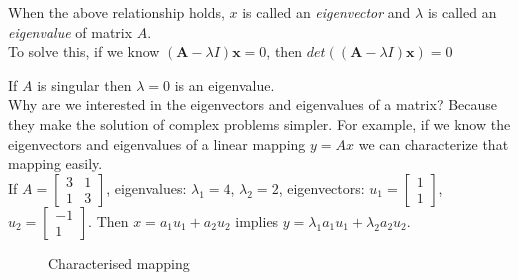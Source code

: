  When the above relationship holds, \( x \) is called an \textit{eigenvector} and \( \lambda \) is called an \textit{eigenvalue} of matrix \( A \).\\

To solve this, if we know $(\textbf{A}-\lambda I)\textbf{x} = 0$, then $det((\textbf{A}-\lambda I)\textbf{x}) = 0$

If \( A \) is singular then \( \lambda = 0 \) is an eigenvalue.\\

Why are we interested in the eigenvectors and eigenvalues of a matrix? Because they make the solution of complex problems simpler. For example, if we know the eigenvectors and eigenvalues of a linear mapping \( y = Ax \) we can characterize that mapping easily.\\ If \( A = \begin{bmatrix} 3 & 1 \\ 1 & 3 \end{bmatrix} \), eigenvalues: \( \lambda_1 = 4 \), \( \lambda_2 = 2 \), eigenvectors: \( u_1 = \begin{bmatrix} 1 \\ 1 \end{bmatrix} \), \( u_2 = \begin{bmatrix} -1 \\ 1 \end{bmatrix} \).
Then \( x = a_1u_1 + a_2u_2 \) implies \( y = \lambda_1a_1u_1 + \lambda_2a_2u_2 \).

\begin{figure}[H]
    \centering
{}

    \caption{Characterised mapping}
    \label{fig:eigens}
\end{figure}

